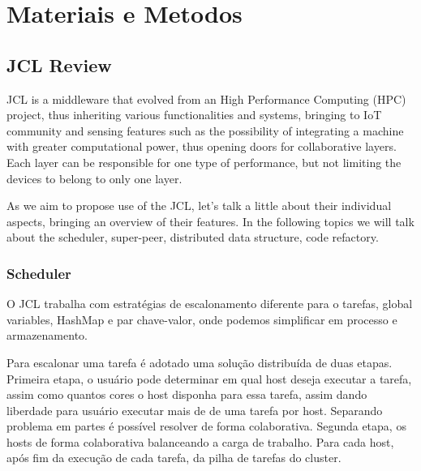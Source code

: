 \documentclass[12pt]{article}
\begin{document}
\section{Materiais e Metodos}
\subsection{JCL Review}
JCL is a middleware that evolved from an High Performance Computing (HPC) project, thus inheriting various functionalities and systems, bringing to IoT community and sensing features such as the possibility of integrating a machine with greater computational power, thus opening doors for collaborative layers. Each layer can be responsible for one type of performance, but not limiting the devices to belong to only one layer.

As we aim to propose use of the JCL, let's talk a little about their individual aspects, bringing an overview of their features. In the following topics we will talk about the scheduler, super-peer, distributed data structure, code refactory. 

\subsubsection{Scheduler}
O JCL trabalha com estratégias de escalonamento diferente para o tarefas, global variables, HashMap e par chave-valor, onde podemos simplificar em processo e armazenamento. 


Para escalonar uma tarefa é adotado uma solução distribuída de duas etapas. Primeira etapa, o usuário pode determinar em qual host deseja executar a tarefa, assim como quantos cores o host disponha para essa tarefa, assim dando liberdade para usuário executar mais de de uma tarefa por host. Separando problema em partes é possível resolver de forma colaborativa. Segunda etapa, os hosts de forma colaborativa balanceando a carga de trabalho. Para cada host, após fim da execução de cada tarefa, da pilha de tarefas do cluster.

\end{document}
